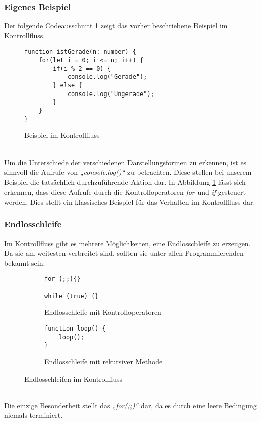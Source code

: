 \subsubsection{Eigenes Beispiel}
Der folgende Codeausschnitt \ref{fig:KontrollflussIstGerade} zeigt das vorher beschriebene Beispiel im Kontrollfluss. 
\begin{figure}[h]
    \centering
        \begin{verbatim}
function istGerade(n: number) {
    for(let i = 0; i <= n; i++) {
        if(i % 2 == 0) {
            console.log("Gerade");
        } else {
            console.log("Ungerade");
        }
    }
}
        \end{verbatim}
    \caption{Beispiel im Kontrollfluss}
    \label{fig:KontrollflussIstGerade}
\end{figure}\\
Um die Unterschiede der verschiedenen Darstellungsformen zu erkennen, ist es sinnvoll die Aufrufe von \textit{„console.log()“} zu betrachten.
Diese stellen bei unserem Beispiel die tatsächlich durchzuführende Aktion dar.
In Abbildung \ref{fig:KontrollflussIstGerade} lässt sich erkennen, dass diese Aufrufe durch die Kontrolloperatoren \textit{for} und \textit{if} gesteuert werden.
Dies stellt ein klassisches Beispiel für das Verhalten im Kontrollfluss dar.
\subsubsection{Endlosschleife}
Im Kontrollfluss gibt es mehrere Möglichkeiten, eine Endlosschleife zu erzeugen.
Da sie am weitesten verbreitet sind, sollten sie unter allen Programmierenden bekannt sein.
\begin{figure}[ht]
    \begin{subfigure}[t]{0.49\textwidth}
        \centering
        \begin{minipage}[t]{\linewidth}
            \begin{verbatim}
for (;;){}

while (true) {}
            \end{verbatim}
        \end{minipage}
        \caption{Endlosschleife mit Kontrolloperatoren}
        \label{fig:endloss1}
    \end{subfigure}
    \hfill
    \begin{subfigure}[t]{0.49\textwidth}
        \centering
        \begin{minipage}[t]{\linewidth}
            \begin{verbatim}
function loop() {
    loop();
}
            \end{verbatim}
        \end{minipage}
        \caption{Endlosschleife mit rekursiver Methode}
        \label{fig:endloss2}
    \end{subfigure}
    \caption{Endlosschleifen im Kontrollfluss \citep[S. 314]{fiveLines.2023}}
    \label{fig:Endlossschleifen1}
\end{figure}\\
Die einzige Besonderheit stellt das \textit{„for(;;)“} dar, da es durch eine leere Bedingung niemals terminiert.
